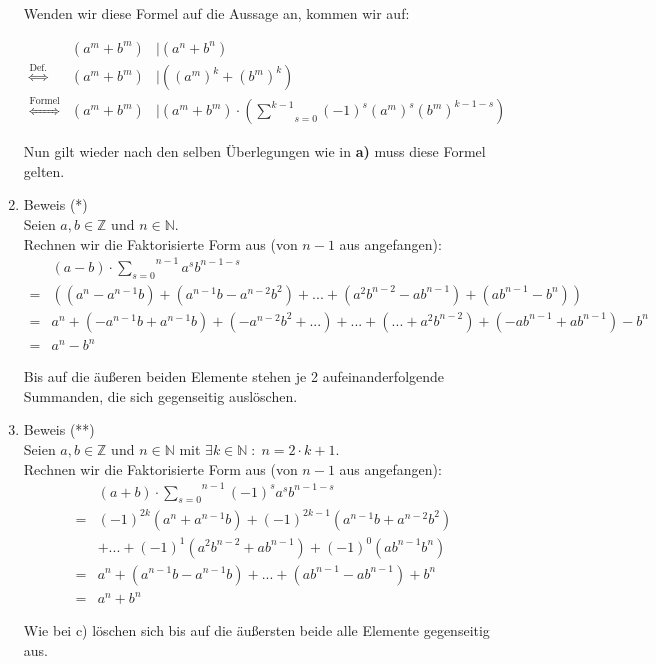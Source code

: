 \documentclass[11pt,a4paper,ngerman]{article}
\newcommand{\N}{\mathbb{N}}
\newcommand{\Z}{\mathbb{Z}}
\begin{document}
\begin{enumerate}[\bfseries a)]
Wenden wir diese Formel auf die Aussage an, kommen wir auf:

$$
\begin{array}{crl}

& \left( a^m + b^m \right) &| \left( a^n + b^n \right)\\
\stackrel{\text{Def.}}{\Leftrightarrow}& \left( a^m + b^m \right) &| \left( \left( a^m \right)^k + \left( b^m\right)^k \right)\\
\stackrel{\text{Formel}}{\Leftrightarrow} & \left( a^m + b^m \right) &| \left( a^m + b^m \right)\cdot \left( \underset{s=0}{\overset{k-1}{\sum}} (-1)^s \left( a^m \right)^s \left( b^m \right)^{k-1-s} \right)
\end{array}
$$

Nun gilt wieder nach den selben Überlegungen wie in \textbf{a)} muss diese Formel gelten.

\item Beweis (*)\\

Seien $a,b \in \Z$ und $n \in \N$.\\
Rechnen wir die Faktorisierte Form aus (von $n-1$ aus angefangen):
$$
\begin{array}{cl}
& \left( a - b\right) \cdot \overset{n-1}{\underset{s=0}{\sum}} a^s b^{n-1-s} \\
=& \left( \left( a^n - a^{n-1}b \right) + \left( a^{n-1} b - a^{n-2}b^2 \right) + ... + \left( a^2b^{n-2} - ab^{n-1} \right) + \left(ab^{n-1} - b^n \right) \right)\\
=&  a^n + \left( - a^{n-1}b +  a^{n-1} b \right)  + \left( - a^{n-2}b^2  + ... \right) +  ...+ \left( ...+   a^2b^{n-2}\right) + \left(  - ab^{n-1}  + ab^{n-1}\right) - b^n\\
=& a^n - b^n
\end{array}
$$

Bis auf die äußeren beiden Elemente stehen je 2 aufeinanderfolgende Summanden, die sich gegenseitig auslöschen.

\item Beweis (**)\\

Seien $a,b \in \Z$ und $n \in \N$ mit $\exists k \in \N \; : \; n = 2\cdot k + 1$.\\
Rechnen wir die Faktorisierte Form aus (von $n-1$ aus angefangen):
$$
\begin{array}{cl}
& \left( a + b \right) \cdot \overset{n-1}{\underset{s=0}{\sum}} (-1)^s a^s b^{n-1-s}\\
=& (-1)^{2k} \left( a^n + a^{n-1}b \right) + (-1)^{2k-1} \left( a^{n-1}b + a^{n-2}b^2 \right) \\
& + ... + (-1)^{1} \left(a^2b^{n-2} + ab^{n-1} \right) + (-1)^0 \left( ab^{n-1} b^n\right)\\
=& a^n + \left( a^{n-1}b - a^{n-1}b \right) + ... + \left(ab^{n-1} - ab^{n-1} \right) + b^n\\
=& a^n + b^n
\end{array}
$$

Wie bei c) löschen sich bis auf die äußersten beide alle Elemente gegenseitig aus.

\end{enumerate}
\end{document}
